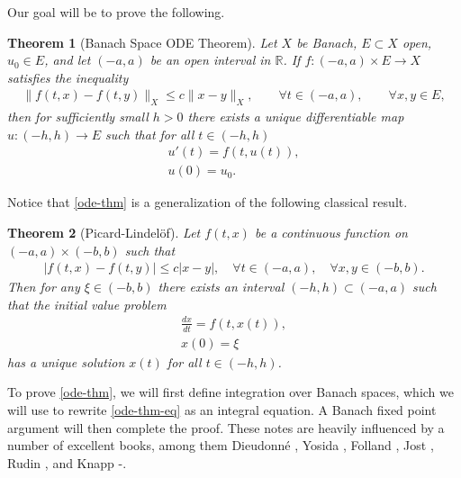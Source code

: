 \documentclass[12pt,reqno]{amsart}
\numberwithin{equation}{section}  %
\numberwithin{figure}{section}
\newcommand{\rr}{\mathbb{R}}
\theoremstyle{plain}
\newtheorem{theorem}{Theorem}
\theoremstyle{definition}
\theoremstyle{remark}
\begin{document}
Our goal will be to prove the following.
%
%
%
%
%
%
%
%
\begin{theorem}[Banach Space ODE Theorem]
	\label{ode-thm}
	Let $X$ be Banach, $E \subset X$ open, $u_0 \in E$, and let $(-a, a)$ be an
	open interval in $\rr$. If $f: (-a, a) \times E \to X$ satisfies the
	inequality
	\begin{equation}
		\label{stronger-ode}
		\begin{split}
			\|f(t, x) - f(t, y) \|_X \le c \|x - y\|_X, \qquad \forall t \in (-a, a),
			\qquad \forall x, y \in E,
		\end{split}
	\end{equation}
	then for sufficiently small $h > 0$ there exists a unique
	differentiable map \\ $u: (-h, h) \to E$ such that for all $t \in (-h, h)$
	\begin{gather}
    \label{ode-thm-eq}
			u'(t) = f(t, u(t)),
			\\
      \label{ode-thm-init-data}
			u(0) = u_0.
	\end{gather}
\end{theorem}
%
%
Notice that \autoref{ode-thm} is a 
generalization of the following classical result.
%
%
%
%
%
%
%
%
\begin{theorem}[Picard-Lindel\"{o}f]
	Let $f(t, x)$ be a continuous function on $(- a, a) \times (- b,
	b)$ such that
	\begin{equation*}
		\begin{split}
			| f(t, x) - f(t, y) | \le c| x - y |, \quad \forall t \in (-a, a),
			\quad \forall x,y \in (- b, b).
		\end{split}
	\end{equation*}
	Then for any $\xi \in (-b, b)$ there exists an interval $(-h, h)
	\subset (-a, a)$ such that the initial value problem
	\begin{gather}
			\frac{dx}{dt} = f(t, x(t)),
			\\
			x(0) = \xi 
	\end{gather}
	has a unique solution $x(t)$ for all $t \in (-h, h)$.
	\end{theorem}
To prove \autoref{ode-thm}, we will first define
integration over Banach spaces, which we will use to
rewrite \eqref{ode-thm-eq} as an integral equation. A Banach fixed point
argument will then complete the proof. These notes are heavily influenced by a
number of excellent books, among them Dieudonn{\'e}
\cite{Dieudonne_1969_Foundations-of-}, Yosida \cite{Yosida:1980fk},
Folland \cite{Folland_1999_Real-analysis}, Jost
\cite{Jost-1998-Postmodern-analysis}, Rudin \cite{Rudin:1976uq}, and Knapp
\cite{Knapp:2005rm}-\cite{Knapp:2005yg}.
%
%
%
%
%
%
%
%
%
%
%
%
%
%
\end{document}

